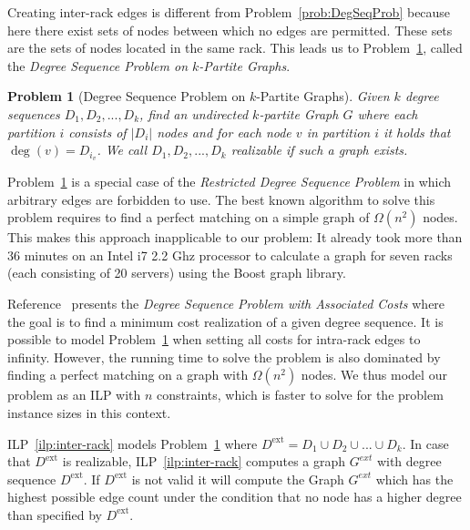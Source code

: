 \documentclass[journal,10pt]{IEEEtran}
\newtheorem{problem}{Problem}
\begin{document}
	

		Creating inter-rack edges is different from Problem~\ref{prob:DegSeqProb} because here there exist sets of nodes
		between which no edges are permitted.
		These sets are the sets of nodes located in the same rack.
		This leads us to
		Problem~\ref{problem:equalKpartiteDegreeSequence}, called the \emph{Degree Sequence Problem on $k$-Partite Graphs}.
\begin{problem}[Degree Sequence Problem on $k$-Partite Graphs]
			Given $k$ degree sequences $D_1, D_2, ..., D_k$, find
			an undirected $k$-partite Graph $G$ where each partition $i$ consists of $|D_i|$ nodes and for each node $v$ in partition
			$i$ it holds that $\deg(v) = D_{i_v}$.
			We call $D_1, D_2, ..., D_k$ \emph{realizable} if such a graph exists.
			\label{problem:equalKpartiteDegreeSequence}
		\end{problem}


		


		Problem~\ref{problem:equalKpartiteDegreeSequence} is a special case of the 
		\emph{Restricted Degree Sequence Problem} \cite{Erdoes:arXiv1301.7523} in which arbitrary edges are forbidden to use.
		The best known algorithm to solve this problem requires to find a perfect matching on a simple graph of $\Omega(n^2)$ nodes.
		This makes this approach inapplicable to our problem: It already took more than 36 minutes on an Intel i7 2.2 Ghz processor to 
		calculate a graph for seven racks (each consisting of 20 servers) using the Boost graph library.
		
		Reference~\cite{milena02} presents the \emph{Degree Sequence Problem with Associated Costs} where the goal is to find
		a minimum cost realization of a given degree sequence. 
		It is possible to model Problem~\ref{problem:equalKpartiteDegreeSequence} when setting all costs for intra-rack edges to infinity.
		However, the running time to solve the problem is also dominated by finding a perfect matching on a graph with 
		$\Omega(n^2)$ nodes. We thus model our problem as an ILP with $n$ constraints, which is faster to solve for the problem instance sizes
		in this context.
		
		ILP~\ref{ilp:inter-rack} models Problem~\ref{problem:equalKpartiteDegreeSequence} where $D^{\mathrm{ext}} = D_1 \cup D_2 \cup ... \cup D_k$.
		In case that $D^{\mathrm{ext}}$ is realizable, ILP~\ref{ilp:inter-rack} computes a graph $G^{ext}$ with degree sequence $D^{\mathrm{ext}}$. 
		If $D^{\mathrm{ext}}$ is not valid it will compute the Graph $G^{ext}$ which has the highest possible edge count
		under the condition that no node has a higher degree than specified by $D^{\mathrm{ext}}$.
		
\end{document}
